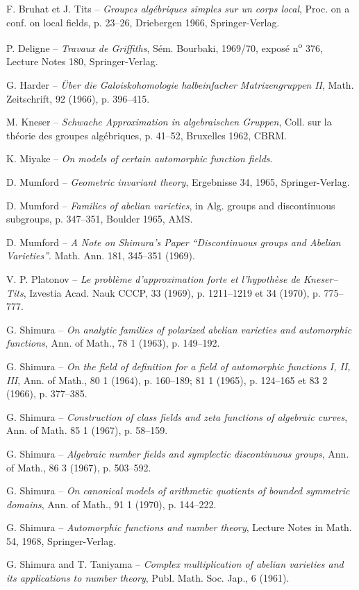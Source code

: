 \documentclass[10pt]{article}
\begin{document}
\begin{description}[leftmargin=3.0em,labelwidth=2.4em,style=nextline]
\item[{[1]}] F. Bruhat et J. Tits -- \emph{Groupes algébriques simples sur un corps local}, Proc. on a conf. on local fields, p. 23--26, Driebergen 1966, Springer-Verlag.
\item[{[2]}] P. Deligne -- \emph{Travaux de Griffiths}, Sém. Bourbaki, 1969/70, exposé n\textsuperscript{o} 376, Lecture Notes 180, Springer-Verlag.
\item[{[3]}] G. Harder -- \emph{Über die Galoiskohomologie halbeinfacher Matrizengruppen II}, Math. Zeitschrift, 92 (1966), p. 396--415.
\item[{[4]}] M. Kneser -- \emph{Schwache Approximation in algebraischen Gruppen}, Coll. sur la théorie des groupes algébriques, p. 41--52, Bruxelles 1962, CBRM.
\item[{[5]}] K. Miyake -- \emph{On models of certain automorphic function fields}.
\item[{[6]}] D. Mumford -- \emph{Geometric invariant theory}, Ergebnisse 34, 1965, Springer-Verlag.
\item[{[7]}] D. Mumford -- \emph{Families of abelian varieties}, in Alg. groups and discontinuous subgroups, p. 347--351, Boulder 1965, AMS.
\item[{[8]}] D. Mumford -- \emph{A Note on Shimura's Paper ``Discontinuous groups and Abelian Varieties''}. Math. Ann. 181, 345--351 (1969).
\item[{[9]}] V. P. Platonov -- \emph{Le problème d'approximation forte et l'hypothèse de Kneser--Tits}, Izvestia Acad. Nauk CCCP, 33 (1969), p. 1211--1219 et 34 (1970), p. 775--777.
\item[{[10]}] G. Shimura -- \emph{On analytic families of polarized abelian varieties and automorphic functions}, Ann. of Math., 78 1 (1963), p. 149--192.
\item[{[11]}] G. Shimura -- \emph{On the field of definition for a field of automorphic functions I, II, III}, Ann. of Math., 80 1 (1964), p. 160--189; 81 1 (1965), p. 124--165 et 83 2 (1966), p. 377--385.
\item[{[12]}] G. Shimura -- \emph{Construction of class fields and zeta functions of algebraic curves}, Ann. of Math. 85 1 (1967), p. 58--159.
\item[{[13]}] G. Shimura -- \emph{Algebraic number fields and symplectic discontinuous groups}, Ann. of Math., 86 3 (1967), p. 503--592.
\item[{[14]}] G. Shimura -- \emph{On canonical models of arithmetic quotients of bounded symmetric domains}, Ann. of Math., 91 1 (1970), p. 144--222.
\item[{[15]}] G. Shimura -- \emph{Automorphic functions and number theory}, Lecture Notes in Math. 54, 1968, Springer-Verlag.
\item[{[16]}] G. Shimura and T. Taniyama -- \emph{Complex multiplication of abelian varieties and its applications to number theory}, Publ. Math. Soc. Jap., 6 (1961).
\end{description}
\end{document}
